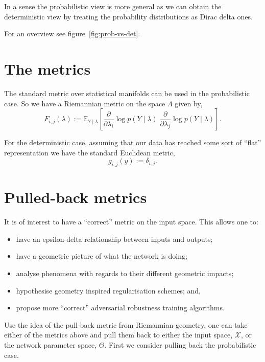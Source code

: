 \documentclass{tufte-handout}
\begin{document}
In a sense the probabilistic view is more general as we can obtain the deterministic view by treating the probability distributions as Dirac delta ones.

For an overview see figure~\ref{fig:prob-vs-det}.

\section{The metrics}

The standard metric over statistical manifolds\cite{Amari2007} can be used in the probabilistic case. So we have a Riemannian metric on the space $\Lambda$ given by,
\begin{equation}
F_{i,j}(\lambda)
:=
\mathbb{E}_{Y \mid \lambda}
\left[
\frac{\partial}{\partial \lambda_i} \log p(Y \mid \lambda)
\;
\frac{\partial}{\partial \lambda_j} \log p(Y \mid \lambda)
\right].
\end{equation}

For the deterministic case, assuming that our data has reached some sort of ``flat'' representation\cite{Cayco_Gajic2026} we have the standard Euclidean metric,
\begin{equation}
g_{i,j}(y) := \delta_{i,j}.
\end{equation}

\section{Pulled-back metrics}

It is of interest to have a ``correct'' metric on the input space. This allows one to:
\begin{itemize}
    \item have an epsilon-delta relationship between inputs and outputs\cite{Hauser2017};
    \item have a geometric picture of what the network is doing;
    \item analyse phenomena with regards to their different geometric impacts\cite{Brandon2025};
    \item hypothesise geometry inspired regularisation schemes; and,
    \item propose more ``correct'' adversarial robustness training algorithms\cite{Tron2022}.
\end{itemize}

Use the idea of the pull-back metric from Riemannian geometry, one can take either of the metrics above and pull them back to either the input space, $\mathcal{X}$, or the network parameter space, $\Theta$. First we consider pulling back the probabilistic case.
\end{document}
